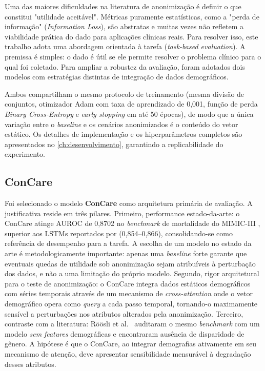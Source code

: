 Uma das maiores dificuldades na literatura de anonimização é definir o que constitui "utilidade aceitável". Métricas puramente estatísticas, como a "perda de informação" (\textit{Information Loss}), são abstratas e muitas vezes não refletem a viabilidade prática do dado para aplicações clínicas reais. Para resolver isso, este trabalho adota uma abordagem orientada à tarefa (\textit{task-based evaluation}). A premissa é simples: o dado é útil se ele permite resolver o problema clínico para o qual foi coletado. Para ampliar a robustez da avaliação, foram adotados dois modelos com estratégias distintas de integração de dados demográficos.

Ambos compartilham o mesmo protocolo de treinamento (mesma divisão de conjuntos, otimizador Adam com taxa de aprendizado de 0,001, função de perda \textit{Binary Cross-Entropy} e \textit{early stopping} em até 50 épocas), de modo que a única variação entre o \textit{baseline} e os cenários anonimizados é o conteúdo do vetor estático. Os detalhes de implementação e os hiperparâmetros completos são apresentados no \autoref{ch:desenvolvimento}, garantindo a replicabilidade do experimento.

\subsection{ConCare}

Foi selecionado o modelo \textbf{ConCare} \cite{Ma2020} como arquitetura primária de avaliação. A justificativa reside em três pilares. Primeiro, performance estado-da-arte: o ConCare atinge AUROC de 0,8702 no \textit{benchmark} de mortalidade do MIMIC-III \cite{Ma2020}, superior aos LSTMs reportados por  (0,854–0,866), consolidando-se como referência de desempenho para a tarefa. A escolha de um modelo no estado da arte é metodologicamente importante: apenas uma \textit{baseline} forte garante que eventuais quedas de utilidade sob anonimização sejam atribuíveis à perturbação dos dados, e não a uma limitação do próprio modelo. Segundo, rigor arquitetural para o teste de anonimização: o ConCare integra dados estáticos demográficos com séries temporais através de um mecanismo de \textit{cross-attention} onde o vetor demográfico opera como \textit{query} a cada passo temporal, tornando-o maximamente sensível a perturbações nos atributos alterados pela anonimização. Terceiro, contraste com a literatura: Röösli et al.\ \cite{Roosli2022} auditaram o mesmo \textit{benchmark} com um modelo \textit{sem} \textit{features} demográficas e encontraram ausência de disparidade de gênero. A hipótese é que o ConCare, ao integrar demografias ativamente em seu mecanismo de atenção, deve apresentar sensibilidade mensurável à degradação desses atributos.

